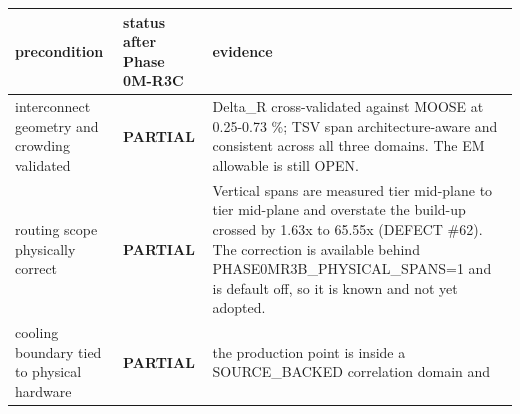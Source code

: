 \documentclass[10pt,]{article}
\begin{document}
\begin{longtable}[]{@{}lll@{}}
\toprule
\begin{minipage}[b]{0.30\columnwidth}\raggedright
precondition\strut
\end{minipage} & \begin{minipage}[b]{0.30\columnwidth}\raggedright
status after Phase 0M-R3C\strut
\end{minipage} & \begin{minipage}[b]{0.30\columnwidth}\raggedright
evidence\strut
\end{minipage}\tabularnewline
\midrule
\endhead
\begin{minipage}[t]{0.30\columnwidth}\raggedright
interconnect geometry and crowding validated\strut
\end{minipage} & \begin{minipage}[t]{0.30\columnwidth}\raggedright
\textbf{PARTIAL}\strut
\end{minipage} & \begin{minipage}[t]{0.30\columnwidth}\raggedright
Delta\_R cross-validated against MOOSE at 0.25-0.73 \%; TSV span
architecture-aware and consistent across all three domains. The EM
allowable is still OPEN.\strut
\end{minipage}\tabularnewline
\begin{minipage}[t]{0.30\columnwidth}\raggedright
routing scope physically correct\strut
\end{minipage} & \begin{minipage}[t]{0.30\columnwidth}\raggedright
\textbf{PARTIAL}\strut
\end{minipage} & \begin{minipage}[t]{0.30\columnwidth}\raggedright
Vertical spans are measured tier mid-plane to tier mid-plane and
overstate the build-up crossed by 1.63x to 65.55x (DEFECT \#62). The
correction is available behind PHASE0MR3B\_PHYSICAL\_SPANS=1 and is
default off, so it is known and not yet adopted.\strut
\end{minipage}\tabularnewline
\begin{minipage}[t]{0.30\columnwidth}\raggedright
cooling boundary tied to physical hardware\strut
\end{minipage} & \begin{minipage}[t]{0.30\columnwidth}\raggedright
\textbf{PARTIAL}\strut
\end{minipage} & \begin{minipage}[t]{0.30\columnwidth}\raggedright
the production point is inside a SOURCE\_BACKED correlation domain and

\end{minipage}
\end{longtable}
\end{document}
